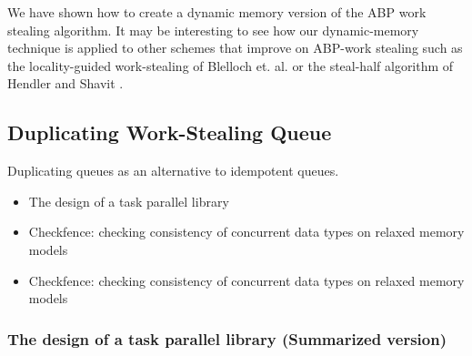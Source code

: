 We have shown how to create a dynamic memory version of the ABP work
stealing algorithm. It may be interesting to see how our
dynamic-memory technique is applied to other schemes that improve on
ABP-work stealing such as the locality-guided work-stealing of
Blelloch et. al. \cite{Acar2002} or the steal-half algorithm of
Hendler and Shavit \cite{Hendler2002}.











\subsection{Duplicating Work-Stealing Queue}

Duplicating queues as an alternative to idempotent queues.

\begin{itemize}
\item The design of a task parallel library \cite{Leijen2009}
\item Checkfence: checking consistency of concurrent data types on
  relaxed memory models \cite{Burckhardt2007}
\item Checkfence: checking consistency of concurrent data types on
  relaxed memory models \cite{Burckhardt2007a}
\end{itemize}

\subsubsection{The design of a task parallel library \cite{Leijen2009} (Summarized version)}

